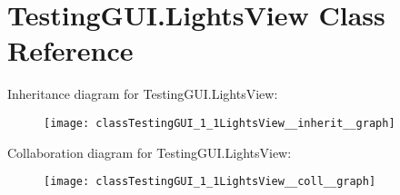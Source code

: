 \hypertarget{classTestingGUI_1_1LightsView}{}\section{Testing\+G\+U\+I.\+Lights\+View Class Reference}
\label{classTestingGUI_1_1LightsView}


Inheritance diagram for Testing\+G\+U\+I.\+Lights\+View\+:
\nopagebreak
\begin{figure}[H]
\begin{center}
\leavevmode
\texttt{[image: classTestingGUI\_1\_1LightsView\_\_inherit\_\_graph]}
\end{center}
\end{figure}


Collaboration diagram for Testing\+G\+U\+I.\+Lights\+View\+:
\nopagebreak
\begin{figure}[H]
\begin{center}
\leavevmode
\texttt{[image: classTestingGUI\_1\_1LightsView\_\_coll\_\_graph]}
\end{center}
\end{figure}
